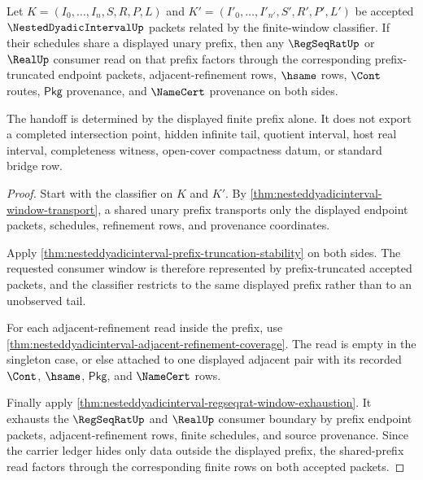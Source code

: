 \begin{theorem}
\label{thm:nesteddyadicinterval-shared-prefix-handoff}
Let $K=(I_0,\ldots,I_n,S,R,P,L)$ and
$K'=(I'_0,\ldots,I'_{n'},S',R',P',L')$ be accepted
$\NestedDyadicIntervalUp$ packets related by the finite-window classifier. If
their schedules share a displayed unary prefix, then any $\RegSeqRatUp$ or
$\RealUp$ consumer read on that prefix factors through the corresponding
prefix-truncated endpoint packets, adjacent-refinement rows, $\hsame$ rows,
$\Cont$ routes, $\mathsf{Pkg}$ provenance, and $\NameCert$ provenance on both
sides.

The handoff is determined by the displayed finite prefix alone. It does not
export a completed intersection point, hidden infinite tail, quotient interval,
host real interval, completeness witness, open-cover compactness datum, or
standard bridge row.
\end{theorem}
\begin{proof}
Start with the classifier on $K$ and $K'$. By
\autoref{thm:nesteddyadicinterval-window-transport}, a shared unary prefix
transports only the displayed endpoint packets, schedules, refinement rows, and
provenance coordinates.

Apply \autoref{thm:nesteddyadicinterval-prefix-truncation-stability} on both
sides. The requested consumer window is therefore represented by
prefix-truncated accepted packets, and the classifier restricts to the same
displayed prefix rather than to an unobserved tail.

For each adjacent-refinement read inside the prefix, use
\autoref{thm:nesteddyadicinterval-adjacent-refinement-coverage}. The read is
empty in the singleton case, or else attached to one displayed adjacent pair
with its recorded $\Cont$, $\hsame$, $\mathsf{Pkg}$, and $\NameCert$ rows.

Finally apply
\autoref{thm:nesteddyadicinterval-regseqrat-window-exhaustion}. It exhausts
the $\RegSeqRatUp$ and $\RealUp$ consumer boundary by prefix endpoint packets,
adjacent-refinement rows, finite schedules, and source provenance. Since the
carrier ledger hides only data outside the displayed prefix, the shared-prefix
read factors through the corresponding finite rows on both accepted packets.
\end{proof}

